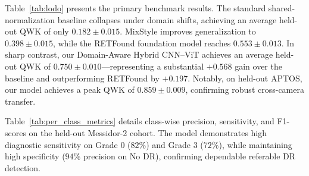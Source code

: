 \documentclass[conference]{IEEEtran}
\begin{document}
\begin{table}[htbp]
    \centering
    \caption{Three-Fold LODO Held-Out Target-Domain Performance (QWK Score, Mean $\pm$ Std Dev across $N=3$ seeds)}
    \label{tab:lodo}
\end{table}

Table~\ref{tab:lodo} presents the primary benchmark results. The standard shared-normalization baseline collapses under domain shifts, achieving an average held-out QWK of only $0.182 \pm 0.015$. MixStyle improves generalization to $0.398 \pm 0.015$, while the RETFound foundation model reaches $0.553 \pm 0.013$. In sharp contrast, our Domain-Aware Hybrid CNN--ViT achieves an average held-out QWK of $\mathbf{0.750 \pm 0.010}$---representing a substantial $\mathbf{+0.568}$ gain over the baseline and outperforming RETFound by $+0.197$. Notably, on held-out APTOS, our model achieves a peak QWK of $\mathbf{0.859 \pm 0.009}$, confirming robust cross-camera transfer.

Table~\ref{tab:per_class_metrics} details class-wise precision, sensitivity, and F1-scores on the held-out Messidor-2 cohort. The model demonstrates high diagnostic sensitivity on Grade 0 ($82\%$) and Grade 3 ($72\%$), while maintaining high specificity ($94\%$ precision on No DR), confirming dependable referable DR detection.
\end{document}
